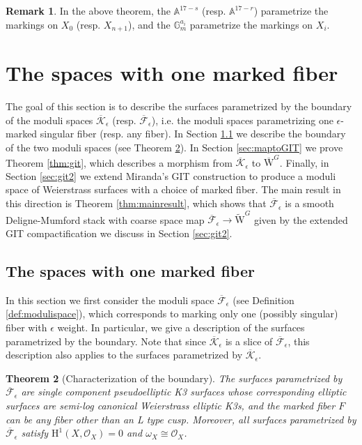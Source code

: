 \documentclass[11pt]{amsart}
\newtheorem{theorem}{Theorem}[section]
\theoremstyle{definition}
\newtheorem{remark}[theorem]{Remark}
\theoremstyle{remark}
\newcommand{\calO}{\mathcal O}
\newcommand{\mb}[1]{\mathbb{#1}}
\newcommand{\oMG}{\overline{\mathrm{W}}^G}
\newcommand{\ke}{\overline{\mathcal{K}}_{\epsilon}}
\newcommand{\fe}{\overline{\mathcal{F}}_\epsilon}
\newcommand{\km}{\fe}
\newcommand{\oMGd}{\widetilde{\mathrm{W}}^G}
\begin{document}
	\begin{remark} In the above theorem, the $\mb{A}^{17-s}$ (resp. $\mb{A}^{17-r}$) parametrize the markings on $X_0$ (resp. $X_{n+1}$), and the $\mb{G}_m^{a_i}$ parametrize the markings on $X_i$. \end{remark}
	
	
	\section{The spaces with one marked fiber}\label{sec:onefiber}
	
	The goal of this section is to describe the surfaces parametrized by the boundary of the moduli spaces $\ke$ (resp. $\fe$), i.e. the moduli spaces parametrizing one $\epsilon$-marked singular fiber (resp. any fiber).
	In Section \ref{sec:onemarked} we describe the boundary of the two moduli spaces (see Theorem \ref{thm:boundary}). In Section \ref{sec:maptoGIT} we prove Theorem \ref{thm:git}, which describes a morphism from $\ke$ to $\oMG$.  Finally, in Section \ref{sec:git2} we extend Miranda's GIT construction to produce a moduli space of Weierstrass surfaces with a choice of marked fiber. The main result in this direction is Theorem \ref{thm:mainresult}, which shows that $\km$ is a smooth Deligne-Mumford stack with coarse space map $\km \to \oMGd$ given by the extended GIT compactification we discuss in Section \ref{sec:git2}. 
	
	
	
	
	
	
	\subsection{The spaces with one marked fiber}\label{sec:onemarked}
	In this section we first consider the moduli space $\km$ (see Definition \ref{def:modulispace}), which corresponds to marking only one (possibly singular) fiber with $\epsilon$ weight. In particular, we give a description of the surfaces parametrized by the boundary. Note that since $\ke$ is a slice of $\km$, this description also applies to the surfaces parametrized by $\ke$. 
	
	\begin{theorem}[Characterization of the boundary]\label{thm:boundary} 
		The surfaces parametrized by $\km$ are single component pseudoelliptic K3 surfaces whose corresponding elliptic surfaces are semi-log canonical Weierstrass elliptic K3s, and the marked fiber $F$ can be any fiber other than an L type cusp. Moreover, all surfaces parametrized by $\km$ satisfy $\mathrm{H}^1(X, \calO_X) = 0$ and $\omega_X \cong \calO_X$. \end{theorem}
	
\end{document}
